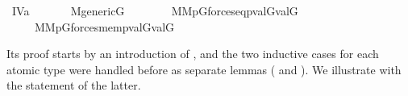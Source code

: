 \begin{isabelle}
  \isamarkupfalse%
  \ IV{}{}{}a{\isacharcolon}\isanewline
  \ \ \isanewline
  \ \ \ \ {\isachardoublequoteopen}M{\isacharunderscore}generic{\isacharparenleft}G{\isacharparenright}{\isachardoublequoteclose}\isanewline
  \ \ \ \isanewline
  \ \ \ \ {\isachardoublequoteopen}{\isacharparenleft}{\isasymtau}{\isasymin}M{\isasymlongrightarrow}{\isasymtheta}{\isasymin}M{\isasymlongrightarrow}{\isacharparenleft}{\isasymforall}p{\isasymin}G{\isachardot}forces{\isacharunderscore}eq{\isacharparenleft}p{\isacharcomma}{\isasymtau}{\isacharcomma}{\isasymtheta}{\isacharparenright}{\isasymlongrightarrow}val{\isacharparenleft}G{\isacharcomma}{\isasymtau}{\isacharparenright}{\isacharequal}val{\isacharparenleft}G{\isacharcomma}{\isasymtheta}{\isacharparenright}{\isacharparenright}{\isacharparenright}{\isasymand}\isanewline
  \ \ \ \ \ {\isacharparenleft}{\isasymtau}{\isasymin}M{\isasymlongrightarrow}{\isasymtheta}{\isasymin}M{\isasymlongrightarrow}{\isacharparenleft}{\isasymforall}p{\isasymin}G{\isachardot}forces{\isacharunderscore}mem{\isacharparenleft}p{\isacharcomma}{\isasymtau}{\isacharcomma}{\isasymtheta}{\isacharparenright}{\isasymlongrightarrow}val{\isacharparenleft}G{\isacharcomma}{\isasymtau}{\isacharparenright}{\isasymin}val{\isacharparenleft}G{\isacharcomma}{\isasymtheta}{\isacharparenright}{\isacharparenright}{\isacharparenright}{\isachardoublequoteclose}
\end{isabelle}
%
Its proof starts by an introduction of , and
the two inductive cases for each atomic type were handled before as
separate lemmas ( and ). We
illustrate with the statement of the latter.
%
